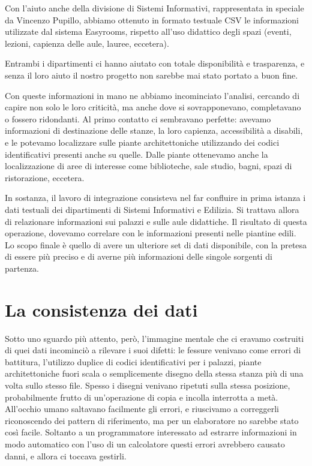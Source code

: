 \documentclass[12pt]{report}
\begin{document}
Con l'aiuto anche della divisione di Sistemi Informativi, rappresentata in
speciale da Vincenzo Pupillo, abbiamo ottenuto in formato testuale CSV le
informazioni utilizzate dal sistema Easyrooms, rispetto all'uso didattico
degli spazi (eventi, lezioni, capienza delle aule, lauree, eccetera).

Entrambi i dipartimenti ci hanno aiutato con totale disponibilità e
trasparenza, e senza il loro aiuto il nostro progetto non sarebbe mai
stato portato a buon fine.

Con queste informazioni in mano ne abbiamo incominciato l'analisi,
cercando di capire non solo le loro criticità, ma anche dove si
sovrapponevano, completavano o fossero ridondanti. Al primo contatto
ci sembravano perfette: avevamo informazioni di destinazione delle
stanze, la loro capienza, accessibilità a disabili, e le potevamo
localizzare sulle piante architettoniche utilizzando dei codici
identificativi presenti anche su quelle. Dalle piante ottenevamo anche
la localizzazione di aree di interesse come biblioteche, sale studio, bagni,
spazi di ristorazione, eccetera.

In sostanza, il lavoro di integrazione consisteva nel far confluire in
prima istanza i dati testuali dei dipartimenti di Sistemi Informativi
e Edilizia. Si trattava allora di relazionare informazioni sui palazzi
e sulle aule didattiche. Il risultato di questa operazione, dovevamo
correlare con le informazioni presenti nelle piantine edili. Lo scopo
finale è quello di avere un ulteriore set di dati disponibile, con la
pretesa di essere più preciso e di averne più informazioni delle
singole sorgenti di partenza.

\section{La consistenza dei dati}

Sotto uno sguardo più attento, però, l'immagine mentale che ci eravamo
costruiti di quei dati incominciò a rilevare i suoi difetti: le
fessure venivano come errori di battitura, l'utilizzo duplice di
codici identificativi per i palazzi, piante architettoniche fuori
scala o semplicemente disegno della stessa stanza più di una volta
sullo stesso file. Spesso i disegni venivano ripetuti sulla stessa
posizione, probabilmente frutto di un'operazione di copia e incolla
interrotta a metà. All'occhio umano saltavano facilmente gli errori, e
riuscivamo a correggerli riconoscendo dei pattern di riferimento, ma per un
elaboratore no sarebbe stato così facile. Soltanto a un programmatore
interessato ad estrarre informazioni in modo automatico con l'uso di un
calcolatore questi errori avrebbero causato danni, e allora ci toccava gestirli.
\end{document}
